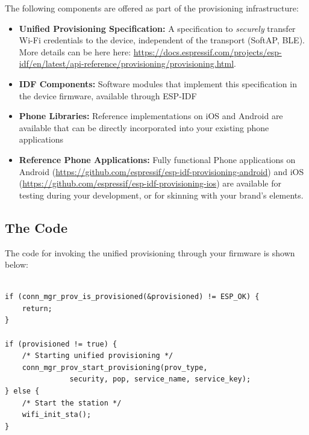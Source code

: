 \documentclass[main.tex]{subfiles}
\begin{document}
The following components are offered as part of the provisioning infrastructure:
\begin{itemize}
    \item \textbf{Unified Provisioning Specification:} A specification to \textit{securely} transfer Wi-Fi credentials to the device, independent of the transport (SoftAP, BLE). More details can be here here: \url{https://docs.espressif.com/projects/esp-idf/en/latest/api-reference/provisioning/provisioning.html}.
    \item \textbf{IDF Components:} Software modules that implement this specification in the device firmware, available through ESP-IDF
    \item \textbf{Phone Libraries:} Reference implementations on iOS and Android are available that can be directly incorporated into your existing phone applications
    \item \textbf{Reference Phone Applications:} Fully functional Phone applications on Android (\url{https://github.com/espressif/esp-idf-provisioning-android}) and iOS (\url{https://github.com/espressif/esp-idf-provisioning-ios}) are available for testing during your development, or for skinning with your brand's elements.
\end{itemize}

\subsection{The Code}
The code for invoking the unified provisioning through your firmware is shown below:
\begin{verbatim}

if (conn_mgr_prov_is_provisioned(&provisioned) != ESP_OK) {
    return;
}

if (provisioned != true) {
    /* Starting unified provisioning */
    conn_mgr_prov_start_provisioning(prov_type,
               security, pop, service_name, service_key);
} else {
    /* Start the station */
    wifi_init_sta();
}
\end{verbatim}
\end{document}
